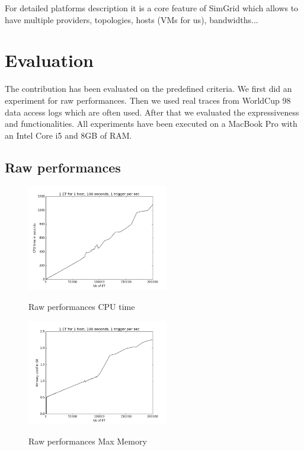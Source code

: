 \documentclass[a4paper]{IEEEtran}
\begin{document}
  For detailed platforms description it is a core feature of SimGrid which 
  allows to have multiple providers, topologies, hosts (VMs for us), 
  bandwidths...


\section{Evaluation} \label{eval}
  The contribution has been evaluated on the predefined criteria. We first did 
  an experiment for raw performances. Then we used real traces from WorldCup 98 
  data access logs \cite{wc98} which are often used. After that we evaluated 
  the expressiveness and functionalities. All experiments have been executed on 
  a MacBook Pro with an Intel Core i5 and 8GB of RAM.
    
  \subsection{Raw performances} \label{raw_perf}
    \begin{figure}
      \caption{Raw performances CPU time}
      \centering
      \includegraphics[width=0.55\textwidth]{../plots/raw_perf_time}
      \label{time_raw}
    \end{figure}
    \begin{figure}
      \caption{Raw performances Max Memory}
      \centering
      \includegraphics[width=0.55\textwidth]{../plots/raw_perf_mem}
      \label{mem_raw}
    \end{figure}
    
\end{document}
